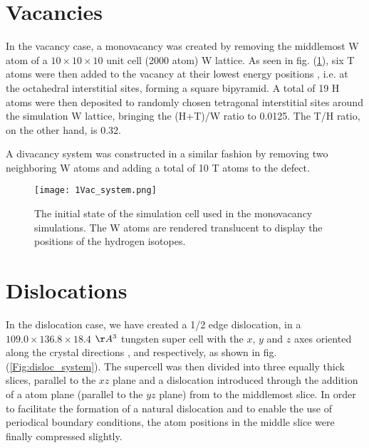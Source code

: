 \section{Vacancies}
In the vacancy case, a monovacancy was created by removing the middlemost W atom of a $10\times 10 \times 10$ unit cell (2000 atom) W lattice. 
As seen in fig. (\ref{Fig:monovac_system}), six T atoms were then added to the vacancy at their lowest energy positions \cite{heinolaTungstenDFT}, i.e. at the octahedral interstitial sites, forming a square bipyramid. 
A total of 19 H atoms were then deposited to randomly chosen tetragonal interstitial sites around the simulation W lattice, bringing the (H+T)/W ratio to 0.0125. 
The T/H ratio, on the other hand, is 0.32.

A divacancy system was constructed in a similar fashion by removing two neighboring W atoms and adding a total of 10 T atoms to the defect.

\begin{figure}[!ht]
\center
\texttt{[image: 1Vac\_system.png]}
\caption{The initial state of the simulation cell used in the monovacancy simulations. 
The W atoms are rendered translucent to display the positions of the hydrogen isotopes.}
\label{Fig:monovac_system}
\end{figure}

\section{Dislocations}
In the dislocation case, we have created a 1/2\hkl[1 1 1] edge dislocation, in a $109.0 \times 136.8 \times 18.4$ $\AA^3$ tungsten super cell with the $x$, $y$ and $z$ axes oriented along the crystal directions  \hkl[1 1 1], \hkl[1 1 -2] and \hkl[-1 1 0] respectively, as shown in fig. (\ref{Fig:disloc_system}). 
The supercell was then divided into three equally thick slices, parallel to the $xz$ plane and a dislocation introduced through the addition of a  atom plane (parallel to the $yz$ plane) from to the middlemost slice. 
In order to facilitate the formation of a natural dislocation and to enable the use of periodical boundary conditions, the atom positions in the middle slice were finally compressed slightly.

